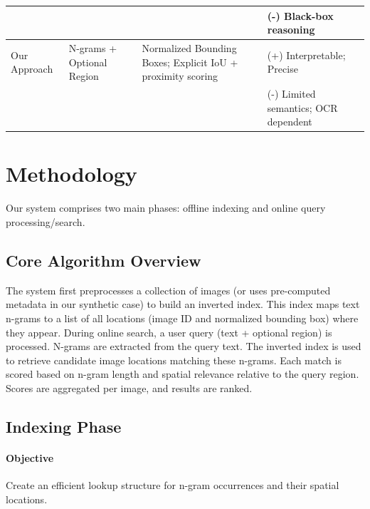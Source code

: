 \documentclass[manuscript,screen]{acmart}
\begin{document}
\begin{table}
\begin{tabular}{p{2.8cm}p{2.8cm}p{4.5cm}p{3.4cm}}
                                                           &                           &                                                                                    & (-) Black-box reasoning              \\
        \midrule
        Our Approach                                       & N-grams + Optional Region & Normalized Bounding Boxes; Explicit IoU + proximity scoring                        & (+) Interpretable; Precise           \\
                                                           &                           &                                                                                    & (-) Limited semantics; OCR dependent \\
        \bottomrule
    \end{tabular}
\end{table}

\section{Methodology}

Our system comprises two main phases: offline indexing and online query processing/search.

\subsection{Core Algorithm Overview}

The system first preprocesses a collection of images (or uses pre-computed metadata in our synthetic case) to build an inverted index. This index maps text n-grams to a list of all locations (image ID and normalized bounding box) where they appear. During online search, a user query (text + optional region) is processed. N-grams are extracted from the query text. The inverted index is used to retrieve candidate image locations matching these n-grams. Each match is scored based on n-gram length and spatial relevance relative to the query region. Scores are aggregated per image, and results are ranked.

\subsection{Indexing Phase}

\paragraph{Objective} Create an efficient lookup structure for n-gram occurrences and their spatial locations.
\end{document}

